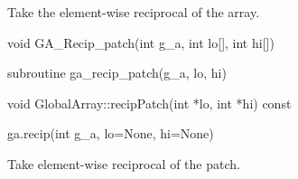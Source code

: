 \documentclass[12pt]{article}
\begin{document}
\gcoll

\begin{desc}
Take the element-wise reciprocal of the array.
\end{desc}


\begin{capi}
\begin{ccode}
void GA_Recip_patch(int g_a, int lo[], int hi[])
\end{ccode}
\begin{funcargs}
\end{funcargs}
\end{capi}

\begin{fapi}
\begin{fcode}
subroutine ga_recip_patch(g_a, lo, hi)
\end{fcode}
\begin{funcargs}
\end{funcargs}
\end{fapi}

\begin{cxxapi}
\begin{cxxcode}
void GlobalArray::recipPatch(int *lo, int *hi) const
\end{cxxcode}
\begin{funcargs}
\end{funcargs}
\end{cxxapi}

\begin{pyapi}
\begin{pycode}
ga.recip(int g_a, lo=None, hi=None)
\end{pycode}
\begin{funcargs}
\end{funcargs}
\end{pyapi}

\gcoll

\begin{desc}
Take element-wise reciprocal of the patch.
\end{desc}
\end{document}
